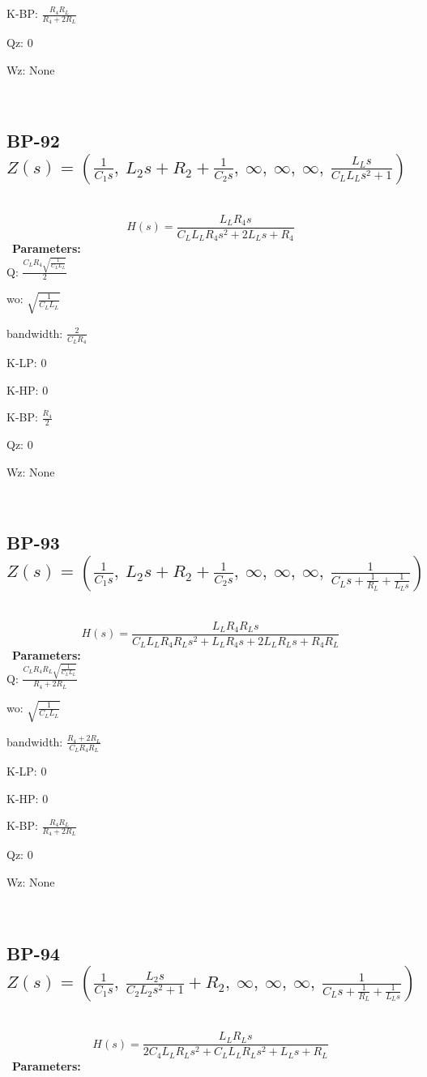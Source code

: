 \documentclass{article}
\begin{document}
K-BP: $\frac{R_{4} R_{L}}{R_{4} + 2 R_{L}}$\ 

Qz: $0$\ 

Wz: $\text{None}$\ 

\ 

\subsection{BP-92 $Z(s) = \left( \frac{1}{C_{1} s}, \  L_{2} s + R_{2} + \frac{1}{C_{2} s}, \  \infty, \  \infty, \  \infty, \  \frac{L_{L} s}{C_{L} L_{L} s^{2} + 1}\right)$ } \ 
\textbf{\[H(s) = \frac{L_{L} R_{4} s}{C_{L} L_{L} R_{4} s^{2} + 2 L_{L} s + R_{4}}\] } \ 
\textbf{Parameters:}\\ 

Q: $\frac{C_{L} R_{4} \sqrt{\frac{1}{C_{L} L_{L}}}}{2}$\ 

wo: $\sqrt{\frac{1}{C_{L} L_{L}}}$\ 

bandwidth: $\frac{2}{C_{L} R_{4}}$\ 

K-LP: $0$\ 

K-HP: $0$\ 

K-BP: $\frac{R_{4}}{2}$\ 

Qz: $0$\ 

Wz: $\text{None}$\ 

\ 

\subsection{BP-93 $Z(s) = \left( \frac{1}{C_{1} s}, \  L_{2} s + R_{2} + \frac{1}{C_{2} s}, \  \infty, \  \infty, \  \infty, \  \frac{1}{C_{L} s + \frac{1}{R_{L}} + \frac{1}{L_{L} s}}\right)$ } \ 
\textbf{\[H(s) = \frac{L_{L} R_{4} R_{L} s}{C_{L} L_{L} R_{4} R_{L} s^{2} + L_{L} R_{4} s + 2 L_{L} R_{L} s + R_{4} R_{L}}\] } \ 
\textbf{Parameters:}\\ 

Q: $\frac{C_{L} R_{4} R_{L} \sqrt{\frac{1}{C_{L} L_{L}}}}{R_{4} + 2 R_{L}}$\ 

wo: $\sqrt{\frac{1}{C_{L} L_{L}}}$\ 

bandwidth: $\frac{R_{4} + 2 R_{L}}{C_{L} R_{4} R_{L}}$\ 

K-LP: $0$\ 

K-HP: $0$\ 

K-BP: $\frac{R_{4} R_{L}}{R_{4} + 2 R_{L}}$\ 

Qz: $0$\ 

Wz: $\text{None}$\ 

\ 

\subsection{BP-94 $Z(s) = \left( \frac{1}{C_{1} s}, \  \frac{L_{2} s}{C_{2} L_{2} s^{2} + 1} + R_{2}, \  \infty, \  \infty, \  \infty, \  \frac{1}{C_{L} s + \frac{1}{R_{L}} + \frac{1}{L_{L} s}}\right)$ } \ 
\textbf{\[H(s) = \frac{L_{L} R_{L} s}{2 C_{4} L_{L} R_{L} s^{2} + C_{L} L_{L} R_{L} s^{2} + L_{L} s + R_{L}}\] } \ 
\textbf{Parameters:}\\ 
\end{document}
